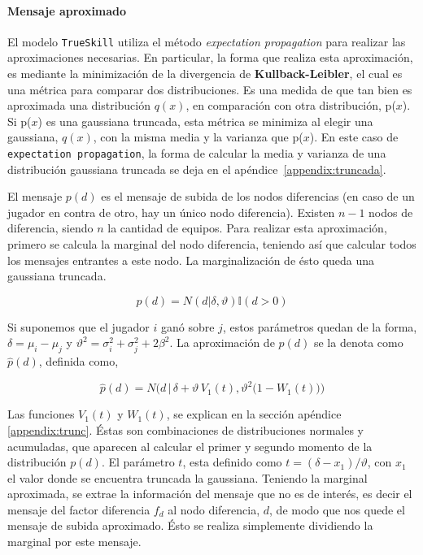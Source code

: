 \documentclass[11pt,twoside,spanish]{report} %
\begin{document}
\paragraph{Mensaje aproximado}

El modelo \texttt{TrueSkill} utiliza el m\'etodo \textit{expectation propagation} para realizar las aproximaciones necesarias.
En particular, la forma que realiza esta aproximaci\'on, es mediante la minimizaci\'on de la divergencia de \textbf{Kullback-Leibler}, el cual es una m\'etrica para comparar dos distribuciones.
Es una medida de que tan bien es aproximada una distribuci\'on $q(x)$, en comparaci\'on con otra distribuci\'on, p($x$).
Si p($x$) es una gaussiana truncada, esta m\'etrica se minimiza al elegir una gaussiana,  $q(x)$, con la misma media y la varianza que p($x$).
En este caso de \texttt{expectation propagation}, la forma de calcular la media y varianza de una distribuci\'on gaussiana truncada se deja en el ap\'endice~\ref{appendix:truncada}.


El mensaje $p(d)$ es el mensaje de subida de los nodos diferencias (en caso de un jugador en contra de otro,  hay un \'unico nodo diferencia).
Existen $n-1$ nodos de diferencia, siendo $n$ la cantidad de equipos.
Para realizar esta aproximaci\'on, primero se calcula la marginal del nodo diferencia, teniendo as\'i que calcular todos los mensajes entrantes a este nodo.
La marginalizaci\'on de \'esto queda una gaussiana truncada.

\begin{equation}
	p(d) = N(d|\delta,\vartheta) \mathbb{I}(d > 0)
\end{equation}

Si suponemos que el jugador $i$ gan\'o sobre $j$, estos par\'ametros quedan de la forma, $\delta = \mu_{i}-\mu_{j}$ y
$\vartheta^2 = \sigma_i^2 + \sigma_j^2+2\beta^2$.
La aproximaci\'on  de $p(d)$ se la denota como $\widehat{p}(d)$, definida como,

\begin{equation}\label{eq:aprox}
\widehat{p}(d) = N\Bigg(d \,  \bigg| \,  \delta + \vartheta \, V_1(t) ,  \vartheta^2 \big( 1 - W_1(t) \big)  \Bigg)
\end{equation}



Las funciones $V_1(t)$ y $W_1(t)$, se explican en la secci\'on ap\'endice \ref{appendix:trunc}.
\'Estas son combinaciones de distribuciones normales y acumuladas, que aparecen al calcular el primer y segundo momento de la distribuci\'on $p(d)$.
El par\'ametro $t$, esta definido como $t = (\delta-x_1)/\vartheta$, con $x_1$ el valor donde se encuentra truncada la gaussiana.
Teniendo la marginal aproximada, se extrae la informaci\'on del mensaje que no es de inter\'es, es decir el mensaje del factor diferencia $f_d$ al nodo diferencia, $d$, de modo que nos quede el mensaje de subida aproximado.
\'Esto se realiza simplemente dividiendo la marginal por este mensaje.
\end{document}
